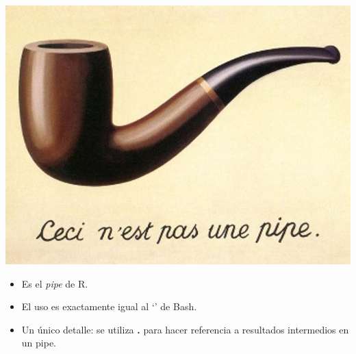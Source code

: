 \documentclass[ignorenonframetext,]{beamer}
\providecommand{\tightlist}{%
  \setlength{\itemsep}{0pt}\setlength{\parskip}{0pt}}
\begin{document}
\begin{frame}{}
\protect\hypertarget{section-13}{}

\includegraphics{streamlining-with-magrittr.jpg}

\end{frame}

\begin{frame}{}
\protect\hypertarget{section-14}{}


\begin{itemize}
\tightlist
\item
  Es el \emph{pipe} de R.
\item
  El uso es exactamente igual al `\textbar{}' de Bash.
\item
  Un único detalle: se utiliza \textbf{.} para hacer referencia a
  resultados intermedios en un pipe.
\end{itemize}

\end{frame}
\end{document}
